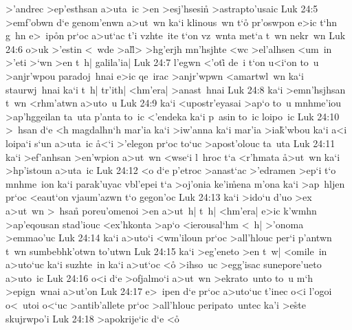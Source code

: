 >'andrec
>ep'esthsan
a>uta~ic
>en
>esj'hsesin\r{}
>astrapto'usaic\bibvsend
\vs Luk 24:5
>emf'obwn
d`e
genom'enwn
a>ut~wn
ka`i
klinous~wn
t`o\r{}
pr'oswpon
e>ic
t`hn
g~hn
e>~ip\r{o}n
pr`oc
a>ut`ac
t'i
vzhte~ite
t`on
vz~wnta
met`a
t~wn
nekr~wn\bibvsend
\vs Luk 24:6
o>uk
>'estin
<~wde
>al\r{l}>
>hg'erjh
mn'hsjhte
<wc
>el'alhsen
<um~in
>'eti
>`wn
>en
t~h|
galila'ia|\bibvsend
\vs Luk 24:7
l'egwn
<'oti\r{}
de~i
t`on
u<i`on
to~u
>anjr'wpou
paradoj~hnai
e>ic
qe~irac
>anjr'wpwn
<amartwl~wn
ka`i
staurwj~hnai
ka`i
t~h|
tr'ith|
<hm'era|
>anast~hnai\bibvsend
\vs Luk 24:8
ka`i
>emn'hsjhsan
t~wn
<rhm'atwn
a>uto~u\bibvsend
\vs Luk 24:9
ka`i
<upostr'eyasai
>ap`o
to~u
mnhme'iou
>ap'hggeilan
ta~uta
p'anta
to~ic
<'endeka
ka`i
p~asin
to~ic
loipo~ic\bibvsend
\vs Luk 24:10
>~hsan
d`e
<h
magdalhn`h
mar'ia
ka`i
>iw'anna
ka`i
mar'ia
>ia\r{k}'wbou
ka`i
a<i
loipa`i
s`un
a>uta~ic
\r{a}<`i
>'elegon
pr`oc
to`uc
>apost'olouc
ta~uta\bibvsend
\vs Luk 24:11
ka`i
>ef'anhsan
>en'wpion
a>ut~wn
<wse`i
l~hroc
t`a
<r'hmata
\r{a}>ut~wn
ka`i
>hp'istoun
a>uta~ic\bibvsend
\vs Luk 24:12
<o
d`e
p'etroc
>anast`ac
>'edramen
>ep`i
t`o
mnhme~ion
ka`i
parak'uyac
vbl'epei
t`a
>oj'onia
ke'i\r{m}ena
m'ona
ka`i
>ap~hljen
pr`oc
<eaut`on
vjaum'azwn
t`o
gegon'oc\bibvsend
\vs Luk 24:13
ka`i
>ido`u
d'uo
>ex
a>ut~wn
>~hsan\r{}
poreu'omenoi
>en
a>ut~h|
t~h|
<hm'era|
e>ic
k'wmhn
>ap'eqousan
stad'iouc
<ex'hkonta
>ap`o
<ierousal`hm
<~h|
>'onoma
>emmao'uc\bibvsend
\vs Luk 24:14
ka`i
a>uto`i
<wm'iloun
pr`oc
>all'hlouc
per`i
p'antwn
t~wn
sumbebhk'otwn
to'utwn\bibvsend
\vs Luk 24:15
ka`i
>eg'eneto
>en
t~w|
<omile~in
a>uto`uc
ka`i
suzhte~in
ka`i
a>ut`oc
<o\r{}
>ihso~uc
>egg'isac
sunepore'ueto
a>uto~ic\bibvsend
\vs Luk 24:16
o<i
d`e
>ofjalmo`i
a>ut~wn
>ekrato~unto
to~u
m`h
>epign~wnai
a>ut'on\bibvsend
\vs Luk 24:17
e>~ipen
d`e
pr`oc
a>uto`uc
t'inec
o<i
l'ogoi
o<~utoi
o<`uc
>antib'allete
pr`oc
>all'hlouc
peripato~untec
ka'i
>e\r{s}te
skujrwpo'i\bibvsend
\vs Luk 24:18
>apokrije`ic
d`e
<o\r{}

